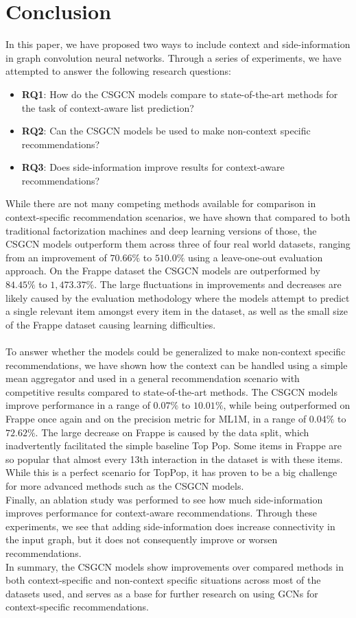\section{Conclusion}\label{sec:conclusion}
In this paper, we have proposed two ways to include context and side-information in graph convolution neural networks.
Through a series of experiments, we have attempted to answer the following research questions:
\begin{itemize}
    \item \textbf{RQ1}: How do the CSGCN models compare to state-of-the-art methods for the task of context-aware list prediction?
    \item \textbf{RQ2}: Can the CSGCN models be used to make non-context specific recommendations?
    \item \textbf{RQ3}: Does side-information improve results for context-aware recommendations?
\end{itemize}
While there are not many competing methods available for comparison in context-specific recommendation scenarios, we have shown that compared to both traditional factorization machines and deep learning versions of those, the CSGCN models outperform them across three of four real world datasets, ranging from an improvement of $70.66\%$ to $510.0\%$ using a leave-one-out evaluation approach.
On the Frappe dataset the CSGCN models are outperformed by $84.45\%$ to $1,473.37\%$.
The large fluctuations in improvements and decreases are likely caused by the evaluation methodology where the models attempt to predict a single relevant item amongst every item in the dataset, as well as the small size of the Frappe dataset causing learning difficulties.\\\\
To answer whether the models could be generalized to make non-context specific recommendations, we have shown how the context can be handled using a simple mean aggregator and used in a general recommendation scenario with competitive results compared to state-of-the-art methods.
The CSGCN models improve performance in a range of $0.07\%$ to $10.01\%$, while being outperformed on Frappe once again and on the precision metric for ML1M, in a range of $0.04\%$ to $72.62\%$.
The large decrease on Frappe is caused by the data split, which inadvertently facilitated the simple baseline Top Pop.
Some items in Frappe are so popular that almost every 13th interaction in the dataset is with these items.
While this is a perfect scenario for TopPop, it has proven to be a big challenge for more advanced methods such as the CSGCN models.
\\
Finally, an ablation study was performed to see how much side-information improves performance for context-aware recommendations.
Through these experiments, we see that adding side-information does increase connectivity in the input graph, but it does not consequently improve or worsen recommendations.
\\
In summary, the CSGCN models show improvements over compared methods in both context-specific and non-context specific situations across most of the datasets used, and serves as a base for further research on using GCNs for context-specific recommendations.

